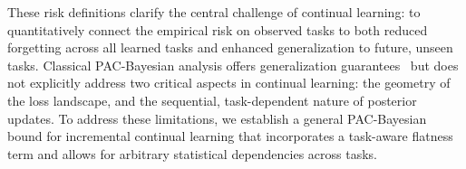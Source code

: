 \documentclass[letterpaper]{article} %
\begin{document}



These risk definitions clarify the central challenge of continual learning: to quantitatively connect the empirical risk on observed tasks to both  reduced forgetting across all learned tasks and enhanced generalization to future, unseen tasks. Classical PAC-Bayesian analysis offers generalization guarantees~ but does not explicitly address two critical aspects in continual learning: the geometry of the loss landscape, and the sequential, task-dependent nature of posterior updates. To address these limitations, we establish a general PAC-Bayesian bound for incremental continual learning that incorporates a task-aware flatness term and allows for arbitrary statistical dependencies across tasks.





\end{document}
